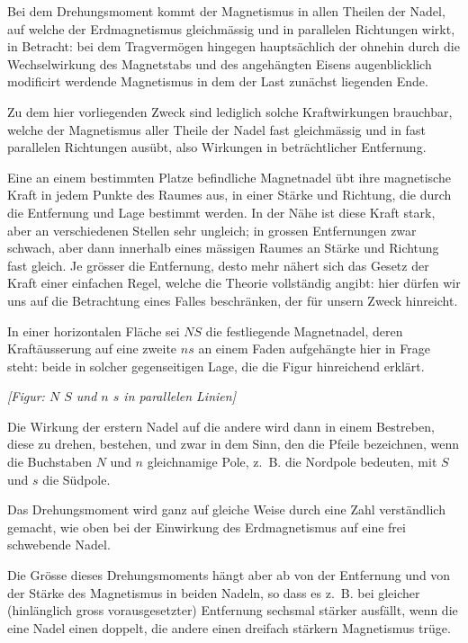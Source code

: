 \documentclass[12pt,a4paper]{article}
\begin{document}
Bei dem Drehungsmoment kommt der Magnetismus in allen Theilen der Nadel, auf welche der Erdmagnetismus gleichmässig und in parallelen Richtungen wirkt, in Betracht: bei dem Tragvermögen hingegen hauptsächlich der ohnehin durch die Wechselwirkung des Magnetstabs und des angehängten Eisens augenblicklich modificirt werdende Magnetismus in dem der Last zunächst liegenden Ende.

Zu dem hier vorliegenden Zweck sind lediglich solche Kraftwirkungen brauchbar, welche der Magnetismus aller Theile der Nadel fast gleichmässig und in fast parallelen Richtungen ausübt, also Wirkungen in beträchtlicher Entfernung.

\bigskip

Eine an einem bestimmten Platze befindliche Magnetnadel übt ihre magnetische Kraft in jedem Punkte des Raumes aus, in einer Stärke und Richtung, die durch die Entfernung und Lage bestimmt werden. In der Nähe ist diese Kraft stark, aber an verschiedenen Stellen sehr ungleich; in grossen Entfernungen zwar schwach, aber dann innerhalb eines mässigen Raumes an Stärke und Richtung fast gleich. Je grösser die Entfernung, desto mehr nähert sich das Gesetz der Kraft einer einfachen Regel, welche die Theorie vollständig angibt: hier dürfen wir uns auf die Betrachtung eines Falles beschränken, der für unsern Zweck hinreicht.

In einer horizontalen Fläche sei $NS$ die festliegende Magnetnadel, deren Kraftäusserung auf eine zweite $ns$ an einem Faden aufgehängte hier in Frage steht: beide in solcher gegenseitigen Lage, die die Figur hinreichend erklärt.

\begin{center}
\textit{[Figur: $N$ \raisebox{0.5ex}{\rule{2em}{0.4pt}} $S$ und $n$ \raisebox{0.5ex}{\rule{2em}{0.4pt}} $s$ in parallelen Linien]}
\end{center}

Die Wirkung der erstern Nadel auf die andere wird dann in einem Bestreben, diese zu drehen, bestehen, und zwar in dem Sinn, den die Pfeile bezeichnen, wenn die Buchstaben $N$ und $n$ gleichnamige Pole, z.~B. die Nordpole bedeuten, mit $S$ und $s$ die Südpole.

Das Drehungsmoment wird ganz auf gleiche Weise durch eine Zahl verständlich gemacht, wie oben bei der Einwirkung des Erdmagnetismus auf eine frei schwebende Nadel.

Die Grösse dieses Drehungsmoments hängt aber ab von der Entfernung und von der Stärke des Magnetismus in beiden Nadeln, so dass es z.~B. bei gleicher (hinlänglich gross vorausgesetzter) Entfernung sechsmal stärker ausfällt, wenn die eine Nadel einen doppelt, die andere einen dreifach stärkern Magnetismus trüge.
\end{document}
